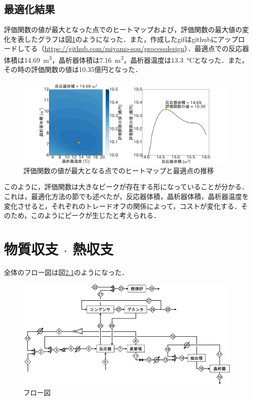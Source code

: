 \documentclass[a4j]{jsreport}
\begin{document}
\section{最適化結果}
評価関数の値が最大となった点でのヒートマップおよび，評価関数の最大値の変化を表したグラフは図\ref{最適化結果}のようになった．また，作成したgifはgithubにアップロードしてる（\url{https://github.com/miyamo-sou/processdesign}）．最適点での反応器体積は14.69\, \si{\cubic \metre}，晶析器体積は7.16\, \si{\cubic \metre}，晶析器温度は13.3\, \si{\degreeCelsius}となった．また，その時の評価関数の値は10.35億円となった．
\begin{figure}[htbp]
  \centering
  \includegraphics[scale=0.1]{snapshot.png}
  \caption{評価関数の値が最大となる点でのヒートマップと最適点の推移}
  \label{最適化結果}
\end{figure}

このように，評価関数は大きなピークが存在する形になっていることが分かる．これは，最適化方法の節でも述べたが，反応器体積，晶析器体積，晶析器温度を変化させると，それぞれのトレードオフの関係によって，コストが変化する．そのため，このようにピークが生じたと考えられる．


\clearpage
\chapter{物質収支 $\cdot$ 熱収支}
全体のフロー図は図\ref{フロー図}のようになった．
\begin{figure}[htbp]
  \centering
  \includegraphics[scale=0.6]{mat_flow.png}
  \caption{フロー図}
  \label{フロー図}
\end{figure}
\end{document}
